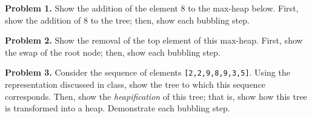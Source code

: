 \documentclass{article}
\begin{document}
\noindent \textbf{Problem 1.} Show the addition of the element 8 to the max-heap below.  First, show the addition of 8 to the tree; then, show each bubbling step.


\vspace{2mm}

\vspace{2mm}

\noindent \textbf{Problem 2.} Show the removal of the top element of this max-heap.  First, show the swap of the root node; then, show each bubbling step.


\vspace{2mm}

\vspace{2mm}

\noindent \textbf{Problem 3.} Consider the sequence of elements \texttt{[2,2,9,8,9,3,5]}.  Using the representation discussed in class, show the tree to which this sequence corresponds.  Then, show the \textit{heapification} of this tree; that is, show how this tree is transformed into a heap.  Demonstrate each bubbling step.



\vspace{2mm}
\end{document}

